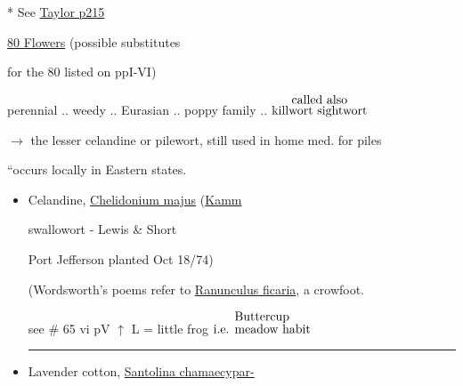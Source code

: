 \documentclass[a4paper,10pt]{article}
\begin{document}
\color{blue}
\begin{flushright}
\par
\end{flushright}
\begin{flushleft}
\color{red} 
\begin{turn}{25}%
* See \ul{Taylor p215} 
\end{turn}
\ul{80 Flowers} (possible substitutes\par
\color{red}
for the 80 listed on ppI-VI) \hfill \color{blue} \par
\color{red}
\small
 perennial .. weedy .. Eurasian .. poppy family .. {$\stackrel{\hbox{called also}}{\hbox{killwort sightwort}}$}\par
 $\rightarrow$ the lesser celandine or pilewort, still used in home med. for piles\par
``occurs locally in Eastern states.\par
\begin{itemize}
\color{blue}
\normalsize
\item Celandine, \ul{Chelidonium majus} (\ul{Kamm}\par
\tiny 
\color{red}
swallowort - Lewis \& Short\par
\color{blue}
\normalsize
\color{red}
 \color{blue}Port Jefferson planted Oct 18/74)\par
\color{red}
\small
{} (Wordsworth's poems refer to \ul{Ranunculus ficaria}, a crowfoot.\par
see \# 65 vi pV 
\color{blue}
\hfill
$\uparrow$ L = little frog $\stackrel{\hbox{Buttercup}}{\hbox{i.e. meadow habit}}$
\rule{10cm}{0.01cm}
\normalsize
\item Lavender cotton, \ul{Santolina chamaecypar-} \par

\end{itemize}
\end{flushleft}
\end{document}
